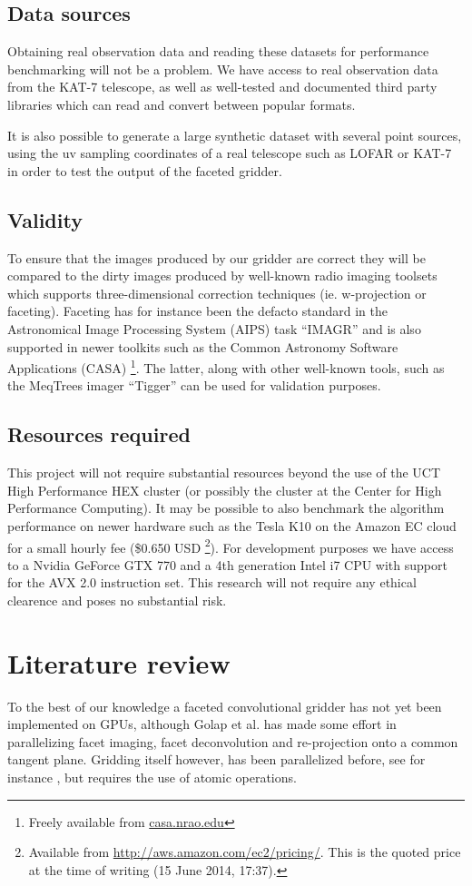 \documentclass[a4paper, two column]{article}
\begin{document}
\subsection{Data sources}
Obtaining real observation data and reading these datasets for performance benchmarking will not be a problem. We have access to real observation data 
from the KAT-7 telescope, as well as well-tested and documented third party libraries which can read and convert between popular formats. 

It is also possible to generate a large synthetic dataset with several point sources, using the uv sampling coordinates of a real telescope such as LOFAR or KAT-7 in order to 
test the output of the faceted gridder.

\subsection{Validity}
To ensure that the images produced by our gridder are correct they will be compared to the dirty images produced by well-known radio imaging toolsets which supports three-dimensional correction techniques (ie. w-projection or faceting). Faceting has
for instance been the defacto standard in the Astronomical Image Processing System (AIPS) task ``IMAGR'' \cite{AIPS113} and is also supported in newer toolkits such as the Common Astronomy Software Applications (CASA) \footnote{Freely available from \url{casa.nrao.edu}}. 
The latter, along with other well-known tools, such as the MeqTrees imager ``Tigger'' can be used for validation purposes.

\subsection{Resources required} 
This project will not require substantial resources beyond the use of the UCT High Performance HEX cluster (or possibly the cluster at the Center for High Performance Computing). It may be possible to also benchmark the algorithm performance
on newer hardware such as the Tesla K10 on the Amazon EC cloud for a small hourly fee (\$0.650 USD \footnote{Available from \url{http://aws.amazon.com/ec2/pricing/}. This is the quoted price at the time of writing (15 June 2014, 17:37).}). For development purposes we have 
access to a Nvidia GeForce GTX 770 and a 4th generation Intel i7 CPU with support for the AVX 2.0 instruction set. This research will not require any ethical clearence and poses no substantial risk.

\section{Literature review}
To the best of our knowledge a faceted convolutional gridder has not yet been implemented on GPUs, although Golap et al. \cite{golap2001parallelization} has 
made some effort in parallelizing facet imaging, facet deconvolution and re-projection onto a common tangent plane. Gridding itself however, has been parallelized 
before, see for instance \cite{varbanescu2008performance,romein2012efficient,muscat2014high}, but requires the use of atomic operations.
 
\end{document}
